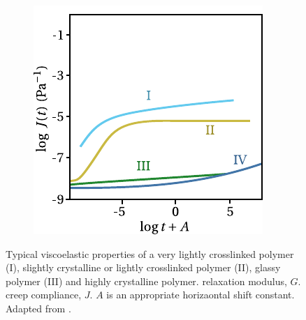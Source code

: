 \begin{figure}[hbtp]
\begin{subfigure}[b]{0.45\textwidth}
							\includegraphics[width=\textwidth]{figures/creep_compliance_scp}
							\caption{}
							\label{subfig:creep_compliance_scp}
			\end{subfigure}
	\caption{Typical viscoelastic properties of a very lightly crosslinked polymer (I), slightly crystalline or lightly crosslinked polymer (II), glassy polymer (III) and highly crystalline polymer.  relaxation modulus, $G$.  creep compliance, $J$. $A$ is an appropriate horizaontal shift constant. Adapted from \cite{ferryViscoelasticPropertiesPolymers1980}.}
\label{fig:relax_creep_scp}
\end{figure}

